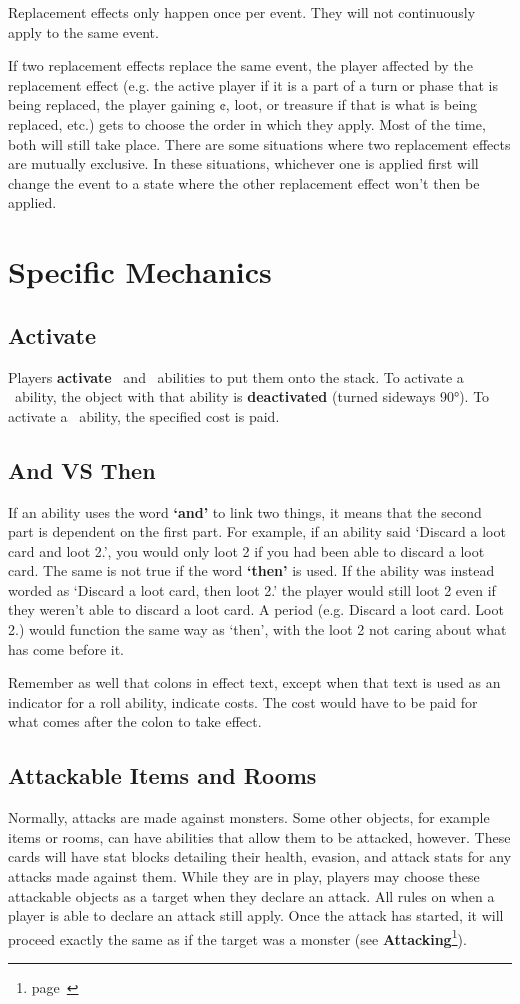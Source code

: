 \documentclass[
  fontsize=10pt,
  paper=a5,
  version=last,
  chapterprefix=true,
  bindingoffset=5mm,
  ]{scrbook}
\newcommand*{\inlineicon}[1]{%
    \raisebox{-.3\baselineskip}{%
        \smash{%
            \texttt{[image: \#1]}%
        }%
    }%
}
\newcommand{\tap}{\inlineicon{./assets/ms-tap.png}}
\newcommand{\pay}{\inlineicon{./assets/ms-paid.png}}
\begin{document}
    Replacement effects only happen once per event. They will not continuously apply to the same event.

    If two replacement effects replace the same event, the player affected by the replacement effect (e.g. the active player if it is a part of a turn or phase that is being replaced, the player gaining ¢, loot, or treasure if that is what is being replaced, etc.) gets to choose the order in which they apply. Most of the time, both will still take place. There are some situations where two replacement effects are mutually exclusive. In these situations, whichever one is applied first will change the event to a state where the other replacement effect won’t then be applied.

    \chapter{Specific Mechanics}
    \label{mechanics}
    \section{Activate}
    Players \textbf{activate} \tap\ and \pay\ abilities to put them onto the stack. To activate a \tap\ ability, the object with that ability is \textbf{deactivated} (turned sideways 90°). To activate a \pay\ ability, the specified cost is paid.
    \section{And VS Then}
    If an ability uses the word \textbf{‘and’} to link two things, it means that the second part is dependent on the first part. For example, if an ability said ‘Discard a loot card and loot 2.’, you would only loot 2 if you had been able to discard a loot card. The same is not true if the word \textbf{‘then’} is used. If the ability was instead worded as ‘Discard a loot card, then loot 2.’ the player would still loot 2 even if they weren’t able to discard a loot card. A period (e.g. Discard a loot card. Loot 2.) would function the same way as ‘then’, with the loot 2 not caring about what has come before it.

    Remember as well that colons in effect text, except when that text is used as an indicator for a roll ability, indicate costs. The cost would have to be paid for what comes after the colon to take effect.
    \section{Attackable Items and Rooms}
    Normally, attacks are made against monsters. Some other objects, for example items or rooms, can have abilities that allow them to be attacked, however. These cards will have stat blocks detailing their health, evasion, and attack stats for any attacks made against them. While they are in play, players may choose these attackable objects as a target when they declare an attack. All rules on when a player is able to declare an attack still apply. Once the attack has started, it will proceed exactly the same as if the target was a monster (see \textbf{Attacking}\footnote{page~\pageref{attacking}}).
\end{document}
